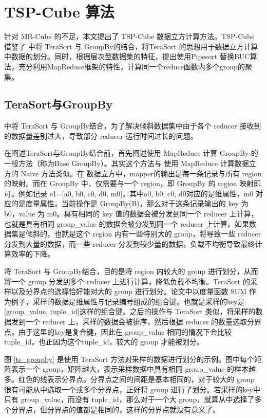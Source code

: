 \chapter{TSP-Cube 算法}

针对 MR-Cube 的不足，本文提出了 TSP-Cube 数据立方计算方法。TSP-Cube 借鉴了 \cite{tao2013minimal} 中将 TeraSort 与 GroupBy的结合，将TeraSort 的思想用于数据立方计算中数据的划分。同时，根据层次型数据集的特征，提出使用Pipesort 替换BUC算法，充分利用MapReduce框架的特性，计算同一个reduce函数内多个group的聚集。


\section{TeraSort与GroupBy}

\cite{tao2013minimal} 中将 TeraSort 与 GroupBy结合，为了解决倾斜数据集中由于各个 reducer 接收到的数据量差别过大，导致部分 reducer 运行时间过长的问题。

在阐述TeraSort与GroupBy结合前，首先阐述使用 MapReduce 计算 GroupBy 的一般方法（称为Base GroupBy）。其实这个方法与 使用 MapReduce 计算数据立方的 Naive 方法类似。在 数据立方中，mapper的输出是每一条记录与所有 region 的映射。而在 GroupBy 中，仅需要与一个 region，即 GroupBy 的 region 映射即可。例如记录 e1=[a0, b0, c0, d0, m0]，其中a0, b0, c0, d0对应的是维属性，m0 对应的是度量属性。当前操作是 GroupBy(B)，那么对于这条记录输出的 key 为 b0，value 为 m0。具有相同的 key 值的数据会被分发到同一个 reducer 上计算，也就是具有相同 group\_value 的数据会被分发到同一个 reducer 上计算。如果数据集是倾斜的，也就是这个 region 内有一些特别大的 group，将导致一些 reducer 分发到大量的数据，而一些 reducer 分发到较少量的数据，负载不均衡导致最终计算效率的下降。

将 TeraSort 与 GroupBy结合，目的是将 region 内较大的 group 进行划分，从而将一个 group 分发到多个 reducer 上进行计算，降低负载不均衡。TeraSort 的采样以及分界点的选择恰好能对大的 group 进行划分。论文中以度量函数 SUM 作为例子，采样的数据是维属性与记录编号组成的组合键。也就是采样的key是[group\_value, tuple\_id]这样的组合键。之后的操作与 TeraSort 类似，将采样的数据发到一个 reducer 上，采样的数据会被排序，然后根据 reducer 的数量选取分界点。由于这里的key是复合键，因此在 group\_value 相同的情况下会比较 tuple\_id。也正因为这个tuple\_id，较大的 group 才能被划分。

图 \ref{ts_groupby} 是使用 TeraSort 方法对采样的数据进行划分的示例。图中每个矩阵表示一个 group，矩阵越大，表示采样数据中具有相同 group\_value 的样本越多。红色的线表示分界点。分界点之间的间距是基本相同的，对于较大的 group 很有可能从中选取一个或多个分界点，正好将 group 进行了划分。若采样的key中只有 group\_value，而没有 tuple\_id，那么对于一个大 group，就算从中选择了多个分界点，但分界点的值都是相同的，这样的分界点就没有意义了。

